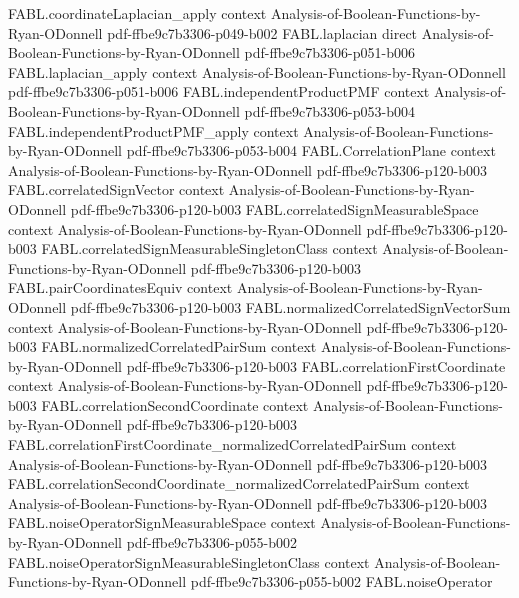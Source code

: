 \begin{theorem}
\proofstep
  {FABL.coordinateLaplacian_apply}
  {context}
  {Analysis-of-Boolean-Functions-by-Ryan-ODonnell}
  {pdf-ffbe9c7b3306-p049-b002}
\proofstep
  {FABL.laplacian}
  {direct}
  {Analysis-of-Boolean-Functions-by-Ryan-ODonnell}
  {pdf-ffbe9c7b3306-p051-b006}
\proofstep
  {FABL.laplacian_apply}
  {context}
  {Analysis-of-Boolean-Functions-by-Ryan-ODonnell}
  {pdf-ffbe9c7b3306-p051-b006}
\proofstep
  {FABL.independentProductPMF}
  {context}
  {Analysis-of-Boolean-Functions-by-Ryan-ODonnell}
  {pdf-ffbe9c7b3306-p053-b004}
\proofstep
  {FABL.independentProductPMF_apply}
  {context}
  {Analysis-of-Boolean-Functions-by-Ryan-ODonnell}
  {pdf-ffbe9c7b3306-p053-b004}
\proofstep
  {FABL.CorrelationPlane}
  {context}
  {Analysis-of-Boolean-Functions-by-Ryan-ODonnell}
  {pdf-ffbe9c7b3306-p120-b003}
\proofstep
  {FABL.correlatedSignVector}
  {context}
  {Analysis-of-Boolean-Functions-by-Ryan-ODonnell}
  {pdf-ffbe9c7b3306-p120-b003}
\proofstep
  {FABL.correlatedSignMeasurableSpace}
  {context}
  {Analysis-of-Boolean-Functions-by-Ryan-ODonnell}
  {pdf-ffbe9c7b3306-p120-b003}
\proofstep
  {FABL.correlatedSignMeasurableSingletonClass}
  {context}
  {Analysis-of-Boolean-Functions-by-Ryan-ODonnell}
  {pdf-ffbe9c7b3306-p120-b003}
\proofstep
  {FABL.pairCoordinatesEquiv}
  {context}
  {Analysis-of-Boolean-Functions-by-Ryan-ODonnell}
  {pdf-ffbe9c7b3306-p120-b003}
\proofstep
  {FABL.normalizedCorrelatedSignVectorSum}
  {context}
  {Analysis-of-Boolean-Functions-by-Ryan-ODonnell}
  {pdf-ffbe9c7b3306-p120-b003}
\proofstep
  {FABL.normalizedCorrelatedPairSum}
  {context}
  {Analysis-of-Boolean-Functions-by-Ryan-ODonnell}
  {pdf-ffbe9c7b3306-p120-b003}
\proofstep
  {FABL.correlationFirstCoordinate}
  {context}
  {Analysis-of-Boolean-Functions-by-Ryan-ODonnell}
  {pdf-ffbe9c7b3306-p120-b003}
\proofstep
  {FABL.correlationSecondCoordinate}
  {context}
  {Analysis-of-Boolean-Functions-by-Ryan-ODonnell}
  {pdf-ffbe9c7b3306-p120-b003}
\proofstep
  {FABL.correlationFirstCoordinate_normalizedCorrelatedPairSum}
  {context}
  {Analysis-of-Boolean-Functions-by-Ryan-ODonnell}
  {pdf-ffbe9c7b3306-p120-b003}
\proofstep
  {FABL.correlationSecondCoordinate_normalizedCorrelatedPairSum}
  {context}
  {Analysis-of-Boolean-Functions-by-Ryan-ODonnell}
  {pdf-ffbe9c7b3306-p120-b003}
\proofstep
  {FABL.noiseOperatorSignMeasurableSpace}
  {context}
  {Analysis-of-Boolean-Functions-by-Ryan-ODonnell}
  {pdf-ffbe9c7b3306-p055-b002}
\proofstep
  {FABL.noiseOperatorSignMeasurableSingletonClass}
  {context}
  {Analysis-of-Boolean-Functions-by-Ryan-ODonnell}
  {pdf-ffbe9c7b3306-p055-b002}
\proofstep
  {FABL.noiseOperator}

\end{theorem}
